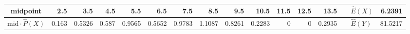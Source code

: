 \begin{table}[ht]
\begin{adjustbox}{width = \textwidth, center}
\begin{tabular}{|cc|r|r|r|r|r|r|r|r|r|r|r|r|r|r|r|}
            \multicolumn{2}{|c|}{\cellcolor[HTML]{FCE5CD}midpoint}                          & \cellcolor[HTML]{FCE5CD}2.5                    & \cellcolor[HTML]{FCE5CD}3.5                    & \cellcolor[HTML]{FCE5CD}4.5                    & \cellcolor[HTML]{FCE5CD}5.5                    & \cellcolor[HTML]{FCE5CD}6.5                    & \cellcolor[HTML]{FCE5CD}7.5                    & \cellcolor[HTML]{FCE5CD}8.5                    & \cellcolor[HTML]{FCE5CD}9.5                     & \cellcolor[HTML]{FCE5CD}10.5                    & \cellcolor[HTML]{FCE5CD}11.5                    & \cellcolor[HTML]{FCE5CD}12.5                    & \cellcolor[HTML]{FCE5CD}13.5                    & \multicolumn{1}{l|}{}                                                           & \multicolumn{1}{l|}{\cellcolor[HTML]{D9D9D9}$\widehat{E}(X)$}           & \cellcolor[HTML]{D9D9D9}6.2391                                                                   \\ \hline
            \multicolumn{2}{|c|}{\cellcolor[HTML]{FCE5CD}$\mathrm{mid}\cdot\widehat{P}(X)$} & \cellcolor[HTML]{FCE5CD}0.163                  & \cellcolor[HTML]{FCE5CD}0.5326                 & \cellcolor[HTML]{FCE5CD}0.587                  & \cellcolor[HTML]{FCE5CD}0.9565                 & \cellcolor[HTML]{FCE5CD}0.5652                 & \cellcolor[HTML]{FCE5CD}0.9783                 & \cellcolor[HTML]{FCE5CD}1.1087                 & \cellcolor[HTML]{FCE5CD}0.8261                  & \cellcolor[HTML]{FCE5CD}0.2283                  & \cellcolor[HTML]{FCE5CD}0                       & \cellcolor[HTML]{FCE5CD}0                       & \cellcolor[HTML]{FCE5CD}0.2935                  & \multicolumn{1}{l|}{}                                                           & \multicolumn{1}{l|}{\cellcolor[HTML]{D9D9D9}$\widehat{E}(Y)$}           & \cellcolor[HTML]{D9D9D9}81.5217                                                                  \\ \hline
        \end{tabular}
    \end{adjustbox}
\end{table}\\
